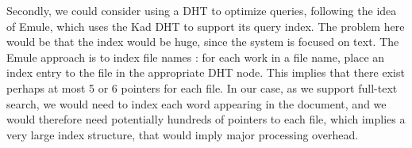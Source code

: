 Secondly, we could consider using a DHT to optimize queries, following the idea of Emule, which uses the Kad DHT to support its query index. The problem here would be that the index would be huge, since the system is focused on text. The Emule approach is to index file names : for each work in a file name, place an index entry to the file in the appropriate DHT node. This implies that there exist perhaps at most 5 or 6 pointers for each file. In our case, as we support full-text search, we would need to index each word appearing in the document, and we would therefore need potentially hundreds of pointers to each file, which implies a very large index structure, that would imply major processing overhead.

